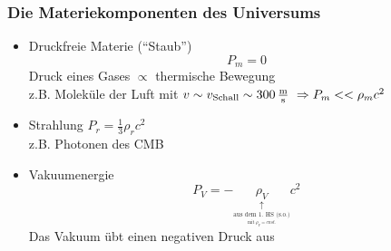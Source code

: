 \subsubsection{Die Materiekomponenten des Universums}
\begin{itemize}
	\item Druckfreie Materie ("`Staub"')
		\begin{equation*}
			P_m=0
		\end{equation*}
		Druck eines Gases $\propto$ thermische Bewegung\\
		z.B. Moleküle der Luft mit $v\sim v_{\text{Schall}}\sim\SI{300}{\frac{\m}{\s}}\ \Rightarrow P_m<<\rho_mc^2$
	\item Strahlung $P_r=\frac{1}{3}\rho_rc^2$\\
		z.B. Photonen des CMB
	\item Vakuumenergie
		\begin{equation*}
			P_V=-\underset{\underset{\underset{\text{mit $\rho_V=cnst.$}}{\text{aus dem 1. HS (s.o.)}}}{\uparrow}}{\rho_V}c^2
		\end{equation*}
		Das Vakuum übt einen negativen Druck aus
\end{itemize}
